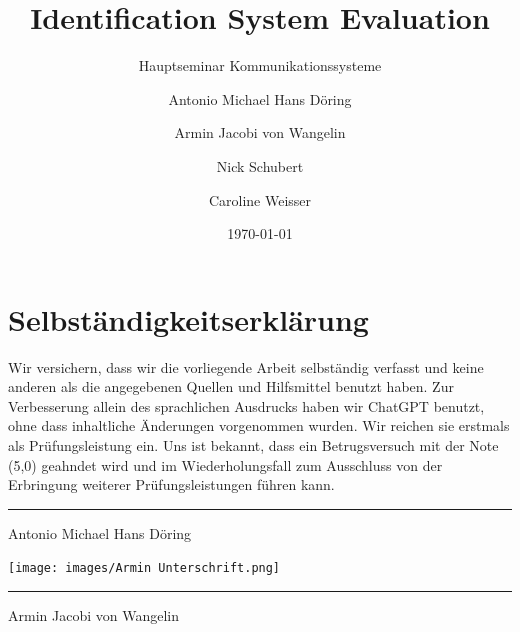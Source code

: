 \documentclass[english,BCOR=4mm,cdfont=false]{tudscrreprt} %
\begin{document}
\date{\today}
\title{Identification System Evaluation}
\subtitle{Hauptseminar Kommunikationssysteme \vspace{3cm}}
\subject{report}

\author{%
    Antonio Michael Hans Döring
    \matriculationnumber{}%
    \and%
    Armin Jacobi von Wangelin
    \matriculationnumber{}%
    \and%
    Nick Schubert
    \matriculationnumber{}
    \and%
    Caroline Weisser
    \matriculationnumber{}
}
\maketitle

\newpage

\newpage


\chapter*{Selbständigkeitserklärung}
\thispagestyle{empty}
Wir versichern, dass wir die vorliegende Arbeit selbständig verfasst und keine 
anderen als die angegebenen Quellen und Hilfsmittel benutzt haben. Zur Verbesserung allein des sprachlichen Ausdrucks haben wir ChatGPT benutzt, ohne dass inhaltliche Änderungen vorgenommen wurden. Wir reichen sie erstmals als Prüfungsleistung ein. Uns ist bekannt, dass ein Betrugsversuch mit der 
Note  (5,0) geahndet wird und im Wiederholungsfall zum 
Ausschluss von der Erbringung weiterer Prüfungsleistungen führen kann.

\vspace{2cm}

\noindent %
\begin{minipage}[c]{0.45\textwidth}
    \vspace{4em} %
    \hrule
    \centering
    Antonio Michael Hans Döring
\end{minipage}
\hfill
\begin{minipage}[c]{0.45\textwidth}
    \texttt{[image: images/Armin Unterschrift.png]}
    \hrule
    \centering
    Armin Jacobi von Wangelin
\end{minipage}

\vspace{3cm}
\end{document}
